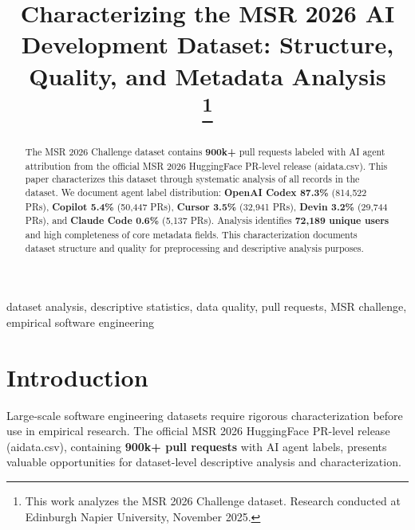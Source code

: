 \documentclass[conference]{IEEEtran}
\begin{document}
\title{Characterizing the MSR 2026 AI Development Dataset: Structure, Quality, and Metadata Analysis\\
\thanks{This work analyzes the MSR 2026 Challenge dataset. Research conducted at Edinburgh Napier University, November 2025.}
}

\author{
}

\maketitle

\begin{abstract}
The MSR 2026 Challenge dataset contains \textbf{900k+} pull requests labeled with AI agent attribution from the official MSR 2026 HuggingFace PR-level release (aidata.csv). This paper characterizes this dataset through systematic analysis of all records in the dataset. We document agent label distribution: \textbf{OpenAI Codex 87.3\%} (814,522 PRs), \textbf{Copilot 5.4\%} (50,447 PRs), \textbf{Cursor 3.5\%} (32,941 PRs), \textbf{Devin 3.2\%} (29,744 PRs), and \textbf{Claude Code 0.6\%} (5,137 PRs). Analysis identifies \textbf{72,189 unique users} and high completeness of core metadata fields. This characterization documents dataset structure and quality for preprocessing and descriptive analysis purposes.
\end{abstract}

\begin{IEEEkeywords}
dataset analysis, descriptive statistics, data quality, pull requests, MSR challenge, empirical software engineering
\end{IEEEkeywords}

\section{Introduction}

Large-scale software engineering datasets require rigorous characterization before use in empirical research. The official MSR 2026 HuggingFace PR-level release (aidata.csv), containing \textbf{900k+ pull requests} with AI agent labels, presents valuable opportunities for dataset-level descriptive analysis and characterization.
\end{document}
